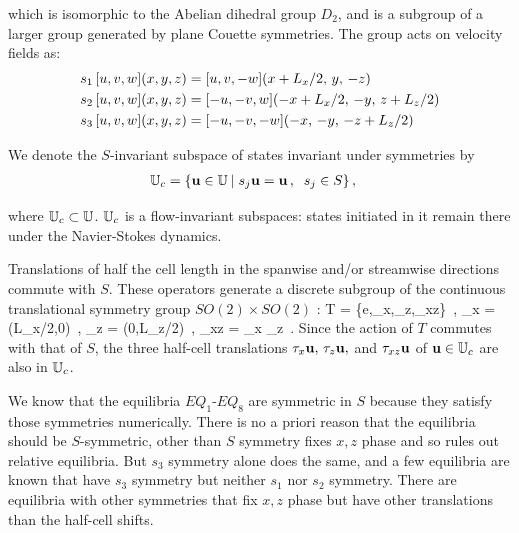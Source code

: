 \documentclass[letter,12pt,openany]{article}
\begin{document}
which is isomorphic to
the Abelian dihedral group $D_2$, and is a subgroup of a larger group generated by plane Couette symmetries. The group acts on velocity fields
as:
\begin{align}
s_1 \, [u, v, w](x,y,z) &= [u, v, -w](x+L_x/2,\, y,\, -z) \nonumber \\ 
s_2 \, [u, v, w](x,y,z) &= [-u, -v, w](-x+L_x/2,\,-y,\,z+L_z/2) \label{shiftRot} \\
s_3 \, [u, v, w](x,y,z) &= [-u,-v,-w](-x,\, -y,\, -z+L_z/2)  \nonumber 
\,
\end{align}


We denote the $S$-invariant subspace of states invariant under
symmetries  by
\begin{align}
\mathbb{U}_{c}  &= \{{\bf u} \in \mathbb{U}  \: | \;
              s_j {\bf u} = {\bf u}\,, \;\;  s_j \in S \}
\,,
\label{symmSubspU}
\end{align}

where $ \mathbb{U}_{c} \subset \mathbb{U}$.
%
$\mathbb{U}_{c}$ is a flow-invariant subspaces: states initiated
in it remain there under the Navier-Stokes dynamics.


Translations of half the cell length in the spanwise and/or streamwise
directions commute with $S$. These operators generate a discrete
subgroup of the continuous translational symmetry group $SO(2) \times
SO(2)$ :
\beq
T = \{e,\tau_x,\tau_z,\tau_{xz}\}
    \,,\qquad
    \tau_x = \tau(L_x/2,0)
    \,,\;
    \tau_z = \tau(0,L_z/2)
    \,,\;
    \tau_{xz} = \tau_x \tau_z
\,.
Since the action of $T$ commutes with that of $S$,
the three half-cell translations $\tau_x {\bf u}, \, \tau_z {\bf u},$ and
$\tau_{xz} {\bf u}$ of ${\bf u} \in \mathbb{U}_{c}$ are also in $\mathbb{U}_{c}$.


We know that the equilibria  $EQ_1$-$EQ_8$ are symmetric in $S$ because they satisfy those symmetries numerically. There is no
a priori reason that the equilibria should be $S$-symmetric, other than $S$ symmetry
fixes $x,z$ phase and so rules out relative equilibria. But $s_3$ symmetry
alone does the same, and a few equilibria are known that have $s_3$ symmetry
but neither $s_1$ nor $s_2$ symmetry. There are equilibria with other symmetries
that fix $x,z$ phase but have other translations than the half-cell shifts.
\end{document}
